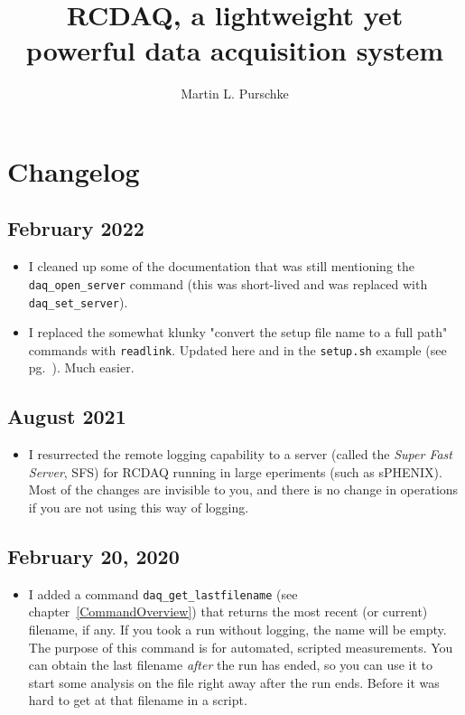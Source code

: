 \documentclass{article}[11pt]
\begin{document}
\title{RCDAQ, a lightweight yet powerful data acquisition system}
\author{Martin L. Purschke}
\maketitle

\tableofcontents

\newpage

\section{Changelog}

\subsection{February 2022}
\begin{itemize}
\item I cleaned up some of the documentation that was still mentioning
the \verb|daq_open_server| command (this was short-lived and was replaced
with \verb|daq_set_server|).
\item I replaced the somewhat klunky "convert the setup file name to a
full path" commands with \verb|readlink|. Updated here and in the
\verb|setup.sh| example (see pg.~\pageref{setupexample}). Much easier. 

\end{itemize}

\subsection{August 2021}
\begin{itemize}
\item I resurrected the remote logging capability to a server (called
  the \emph{Super Fast Server}, SFS) for RCDAQ running in large
  eperiments (such as sPHENIX). Most of the changes are invisible to
  you, and there is no change in operations if you are not using this
  way of logging.

\end{itemize}

\subsection{February 20, 2020}
\begin{itemize}
\item I added a command \verb|daq_get_lastfilename| (see
  chapter~\ref{CommandOverview}) that returns the most recent (or
  current) filename, if any. If you took a run without logging, the
  name will be empty. The purpose of this command is for automated,
  scripted measurements. You can obtain the last filename \emph{after}
  the run has ended, so you can use it to start some analysis on the
  file right away after the run ends. Before it was hard to get at
  that filename in a script.

\end{itemize}
\end{document}
